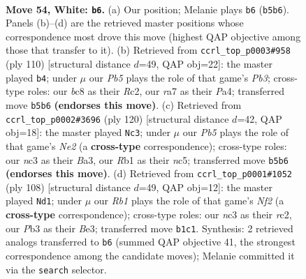 \documentclass[11pt]{article}
\begin{document}
\clearpage

\begin{figure}[p]\centering
\begin{subfigure}{0.46\textwidth}\centering
\resizebox{\linewidth}{!}{%
\newchessgame
\chessboard[
  setfen={1nb2k2/r7/4p3/1P3pNB/1pN2P2/1Pn3P1/5K1P/1R6 w - - 7 54},
  showmover=false,
  pgfstyle=straightmove, color=movearrow, markmove={b5-b6}
]}
\caption{}
\end{subfigure}\hfill
\begin{subfigure}{0.46\textwidth}\centering
\resizebox{\linewidth}{!}{%
\newchessgame
\chessboard[
  setfen={3B2k1/2n5/4p1p1/p6p/P3nb2/1PP4P/2R3P1/7K w - - 1 56},
  showmover=false,
  pgfstyle=straightmove, color=movearrow, markmove={b3-b4}
]}
\caption{}
\end{subfigure}
\\[4pt]
\begin{subfigure}{0.46\textwidth}\centering
\resizebox{\linewidth}{!}{%
\newchessgame
\chessboard[
  setfen={3b4/6k1/3p4/n1n1pPpp/2P1P3/B4P2/B3N1K1/8 w - - 16 61},
  showmover=false,
  pgfstyle=straightmove, color=movearrow, markmove={e2-c3}
]}
\caption{}
\end{subfigure}\hfill
\begin{subfigure}{0.46\textwidth}\centering
\resizebox{\linewidth}{!}{%
\newchessgame
\chessboard[
  setfen={7n/6pk/3n1p2/3Pp3/4P2p/1R2BP2/2r2NPK/8 w - - 3 55},
  showmover=false,
  pgfstyle=straightmove, color=movearrow, markmove={f2-d1}
]}
\caption{}
\end{subfigure}
\caption{\textbf{Move 54, White: \texttt{b6}.} (a) Our position; Melanie plays \texttt{b6} (\texttt{b5b6}). Panels (b)--(d) are the retrieved master positions whose correspondence most drove this move (highest QAP objective among those that transfer to it). (b) Retrieved from \texttt{ccrl\_top\_p0003\#958} (ply 110) [structural distance $d$=49, QAP obj=22]: the master played \texttt{b4}; under $\mu$ our \emph{Pb5} plays the role of that game's \emph{Pb3}; cross-type roles: our \emph{b}c8 as their \emph{R}c2, our \emph{r}a7 as their \emph{P}a4; transferred move \texttt{b5b6} \textbf{(endorses this move)}. (c) Retrieved from \texttt{ccrl\_top\_p0002\#3696} (ply 120) [structural distance $d$=42, QAP obj=18]: the master played \texttt{Nc3}; under $\mu$ our \emph{Pb5} plays the role of that game's \emph{Ne2} (a \textbf{cross-type} correspondence); cross-type roles: our \emph{n}c3 as their \emph{B}a3, our \emph{R}b1 as their \emph{n}c5; transferred move \texttt{b5b6} \textbf{(endorses this move)}. (d) Retrieved from \texttt{ccrl\_top\_p0001\#1052} (ply 108) [structural distance $d$=49, QAP obj=12]: the master played \texttt{Nd1}; under $\mu$ our \emph{Rb1} plays the role of that game's \emph{Nf2} (a \textbf{cross-type} correspondence); cross-type roles: our \emph{n}c3 as their \emph{r}c2, our \emph{P}b3 as their \emph{B}e3; transferred move \texttt{b1c1}. Synthesis: 2 retrieved analogs transferred to \texttt{b6} (summed QAP objective 41, the strongest correspondence among the candidate moves); Melanie committed it via the \texttt{search} selector.}
\label{fig:thought-m106}
\end{figure}
\end{document}

